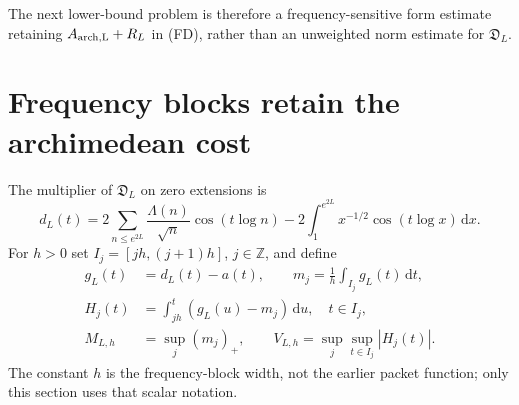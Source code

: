 \documentclass[11pt]{article}
\theoremstyle{remark}\newtheorem{remark}[theorem]{Remark}
\newcommand{\Z}{\mathbb Z}
\newcommand{\dd}{\,\mathrm d}
\begin{document}
The next lower-bound problem is therefore a frequency-sensitive
form estimate retaining $A_{\rm arch,L}+R_L$ in (FD), rather
than an unweighted norm estimate for $\mathfrak D_L$.

\section{Frequency blocks retain the archimedean cost}
The multiplier of $\mathfrak D_L$ on zero extensions is
\[
 d_L(t)=2\sum_{n\le e^{2L}}\frac{\Lambda(n)}{\sqrt n}
                          \cos(t\log n)
             -2\int_1^{e^{2L}}x^{-1/2}\cos(t\log x)\dd x.
\]
For $h>0$ set $I_j=[jh,(j+1)h]$, $j\in\Z$, and define
\[
 \begin{split}
 g_L(t)&=d_L(t)-a(t),\qquad
 m_j=\frac1h\int_{I_j}g_L(t)\dd t,\\
 H_j(t)&=\int_{jh}^{t}(g_L(u)-m_j)\dd u,\quad t\in I_j,\\
 M_{L,h}&=\sup_j(m_j)_+,\qquad
 V_{L,h}=\sup_j\sup_{t\in I_j}|H_j(t)|.
 \end{split}
\]
The constant $h$ is the frequency-block width, not the earlier
packet function; only this section uses that scalar notation.
\end{document}
